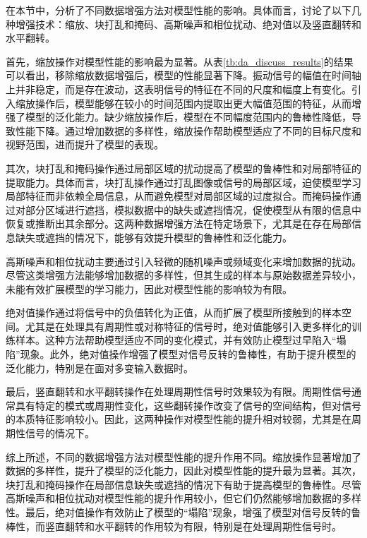 \documentclass[master]{thesis-uestc}
\begin{document}
在本节中，分析了不同数据增强方法对模型性能的影响。具体而言，讨论了以下几种增强技术：缩放、块打乱和掩码、高斯噪声和相位扰动、绝对值以及竖直翻转和水平翻转。

首先，缩放操作对模型性能的影响最为显著。从表\ref{tb:da_discuss_results}的结果可以看出，移除缩放数据增强后，模型的性能显著下降。振动信号的幅值在时间轴上并非稳定，而是存在波动，这表明信号的特征在不同的尺度和幅度上有变化。引入缩放操作后，模型能够在较小的时间范围内提取出更大幅值范围的特征，从而增强了模型的泛化能力。缺少缩放操作后，模型在不同幅度范围内的鲁棒性降低，导致性能下降。通过增加数据的多样性，缩放操作帮助模型适应了不同的目标尺度和视野范围，进而提升了模型的表现。

其次，块打乱和掩码操作通过局部区域的扰动提高了模型的鲁棒性和对局部特征的提取能力。具体而言，块打乱操作通过打乱图像或信号的局部区域，迫使模型学习局部特征而非依赖全局信息，从而避免模型对局部区域的过度拟合。而掩码操作通过对部分区域进行遮挡，模拟数据中的缺失或遮挡情况，促使模型从有限的信息中恢复或推断出其余部分。这两种数据增强方法在特定场景下，尤其是在存在局部信息缺失或遮挡的情况下，能够有效提升模型的鲁棒性和泛化能力。

高斯噪声和相位扰动主要通过引入轻微的随机噪声或频域变化来增加数据的扰动。尽管这类增强方法能够增加数据的多样性，但其生成的样本与原始数据差异较小，未能有效扩展模型的学习能力，因此对模型性能的影响较为有限。

绝对值操作通过将信号中的负值转化为正值，从而扩展了模型所接触到的样本空间。尤其是在处理具有周期性或对称特征的信号时，绝对值能够引入更多样化的训练样本。这种方法帮助模型适应不同的变化模式，并有效防止模型过早陷入“塌陷”现象。此外，绝对值操作增强了模型对信号反转的鲁棒性，有助于提升模型的泛化能力，特别是在面对多变输入数据时。

最后，竖直翻转和水平翻转操作在处理周期性信号时效果较为有限。周期性信号通常具有特定的模式或周期性变化，这些翻转操作改变了信号的空间结构，但对信号的本质特征影响较小。因此，这两种操作对模型性能的提升相对较弱，尤其是在周期性信号的情况下。

综上所述，不同的数据增强方法对模型性能的提升作用不同。缩放操作显著增加了数据的多样性，提升了模型的泛化能力，因此对模型性能的提升最为显著。其次，块打乱和掩码操作在局部信息缺失或遮挡的情况下有助于提高模型的鲁棒性。尽管高斯噪声和相位扰动对模型性能的提升作用较小，但它们仍然能够增加数据的多样性。最后，绝对值操作有效防止了模型的“塌陷”现象，增强了模型对信号反转的鲁棒性，而竖直翻转和水平翻转的作用较为有限，特别是在处理周期性信号时。
\end{document}
